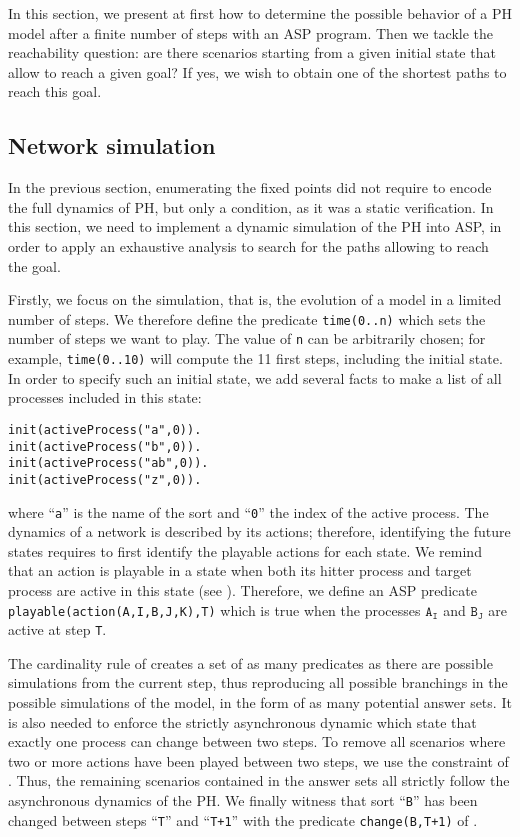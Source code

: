 
In this section, we present at first how to determine the possible behavior of a PH model after a finite number of steps with an ASP program.
Then we tackle the reachability question: are there scenarios starting from a given initial state
that allow to reach a given goal? If yes, we wish to obtain one of the shortest paths to reach this goal.

\subsection{Network simulation}
In the previous section, enumerating the fixed points did not require to
encode the full dynamics of PH, but only a condition, as it was a static verification.
In this section, we need to implement a dynamic simulation of the PH into ASP, in order to apply an exhaustive analysis to search for the paths allowing to reach the goal.

Firstly, we focus on the simulation, that is, the evolution of a model in a limited number of steps.
We therefore define the predicate \texttt{time(0..n)} which sets the number of steps we want to play.
The value of \texttt{n} can be arbitrarily chosen;
for example, \texttt{time(0..10)} will compute the 11 first steps,
including the initial state.
In order to specify such an initial state, we add several facts
to make a list of all processes included in this state:
\begin{lstlisting}
init(activeProcess("a",0)).
init(activeProcess("b",0)).
init(activeProcess("ab",0)).
init(activeProcess("z",0)).
\end{lstlisting}
where ``\texttt{a}'' is the name of the sort and ``\texttt{0}'' the index of the active process.
The dynamics of a network is described by its actions;
therefore, identifying the future states requires to first identify the playable actions for each state.
We remind that an action is playable in a state when both its hitter process and target process are active in this state (see ).
Therefore, we define an ASP predicate \texttt{playable(action(A,I,B,J,K),T)} which is true
when the processes $\texttt{A}_\texttt{I}$ and $\texttt{B}_\texttt{J}$ are active at step \texttt{T}.

The cardinality rule of 
creates a set of as many predicates as there are possible simulations from the current step,
thus reproducing all possible branchings in the possible simulations of the model, in the form of as many potential answer sets. It is also needed to enforce the strictly asynchronous dynamic
which state that exactly one process can change between two steps.
To remove all scenarios where two or more actions have been played between
two steps, we use the constraint of .
Thus, the remaining scenarios contained in the answer sets all strictly follow
the asynchronous dynamics of the PH.
We finally witness that sort ``\texttt{B}'' has been changed between steps ``\texttt{T}'' and ``\texttt{T+1}'' with the predicate \texttt{change(B,T+1)} of .

